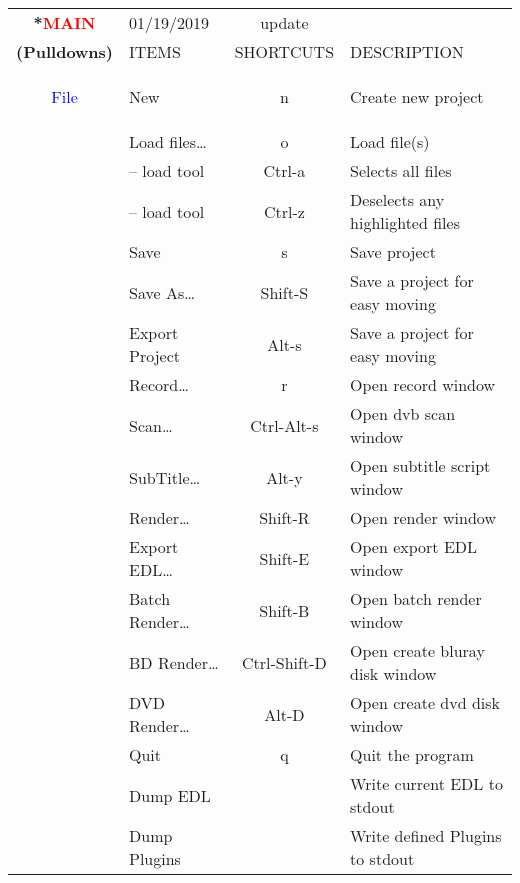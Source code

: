 \begin{center}
    \small
    \begin{longtable}{>{\bfseries}c l c p{6cm}}        
        \toprule
        \multirow{2}*{\textcolor{red}{MAIN}} & 01/19/2019 & update & \\
        \cline{2-4}
        \noalign{\smallskip}
        (Pulldowns) & ITEMS & SHORTCUTS & DESCRIPTION\\        
        \midrule
        \endhead        
        
        \textcolor{blue}{File} & New & n & Create new project \\        
             & Load files\dots & o & Load file(s)\\                          
             & -- load tool & Ctrl-a & Selects all files \\             
             & -- load tool & Ctrl-z & Deselects any highlighted files \\             
             & Save & s & Save project \\             
             & Save As\dots & Shift-S & Save a project for easy moving \\             
             & Export Project & Alt-s & Save a project for easy moving \\             
             & Record\dots & r & Open record window \\             
             & Scan\dots & Ctrl-Alt-s & Open dvb scan window \\             
             & SubTitle\dots & Alt-y & Open subtitle script window \\             
             & Render\dots & Shift-R & Open render window \\             
             & Export EDL\dots & Shift-E & Open export EDL window \\             
             & Batch Render\dots & Shift-B & Open batch render window \\             
             & BD Render\dots & Ctrl-Shift-D & Open create bluray disk window \\             
             & DVD Render\dots & Alt-D & Open create dvd disk window \\             
             & Quit & q & Quit the program \\             
             & Dump EDL &  & Write current EDL to stdout \\             
             & Dump Plugins &  & Write defined Plugins to stdout \\             

\end{longtable}
\end{center}
